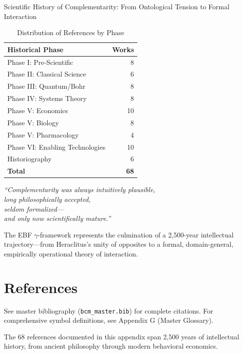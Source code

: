 \begin{chapter}{Scientific History of Complementarity: From Ontological Tension to Formal Interaction}
\begin{table}[h]
\centering
\caption{Distribution of References by Phase}
\label{tab:ref-summary}
\renewcommand{\arraystretch}{1.2}
\begin{tabular}{@{}lr@{}}
\toprule
\textbf{Historical Phase} & \textbf{Works} \\
\midrule
Phase I: Pre-Scientific & 8 \\
Phase II: Classical Science & 6 \\
Phase III: Quantum/Bohr & 8 \\
Phase IV: Systems Theory & 8 \\
Phase V: Economics & 10 \\
Phase V: Biology & 8 \\
Phase V: Pharmacology & 4 \\
Phase VI: Enabling Technologies & 10 \\
Historiography & 6 \\
\midrule
\textbf{Total} & \textbf{68} \\
\bottomrule
\end{tabular}
\end{table}

\begin{tcolorbox}[colback=blue!5!white,colframe=blue!75!black,title=\textbf{Concluding Historical Statement}]
\begin{center}
\large
\textit{``Complementarity was always intuitively plausible,\\
long philosophically accepted,\\
seldom formalized---\\
and only now scientifically mature.''}
\end{center}

\vspace{0.5em}
The EBF $\gamma$-framework represents the culmination of a 2,500-year intellectual trajectory---from Heraclitus's unity of opposites to a formal, domain-general, empirically operational theory of interaction.
\end{tcolorbox}


\section{References}
\label{sec:hty-references}

\nocite{bcm_master}
See master bibliography (\texttt{bcm\_master.bib}) for complete citations.
For comprehensive symbol definitions, see Appendix G (Master Glossary).

The 68 references documented in this appendix span 2,500 years of intellectual history,
from ancient philosophy through modern behavioral economics.

\end{chapter}
